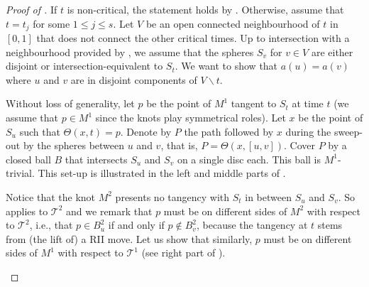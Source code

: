 \documentclass{article}
\newcommand{\T}{\mathcal{T}}
\begin{document}
\begin{proof}[Proof of ]
If $t$ is non-critical, the statement holds by . Otherwise, assume that $t = t_j$ for some $1\leq j \leq s$. Let $V$ be an open connected neighbourhood of $t$ in $[0,1]$ that does not connect the other critical times. Up to intersection with a neighbourhood provided by , we assume that the spheres $S_v$ for $v \in V$ are either disjoint or intersection-equivalent to $S_t$. We want to show that $a(u)= a(v)$ where $u$ and $v$ are in disjoint components of $V \smallsetminus t$.

Without loss of generality, let $p$ be the point of $M^1$ tangent to $S_t$ at time $t$ (we assume that $p \in M^1$ since the knots play symmetrical roles). Let $x$ be the point of $S_u$ such that $\Theta(x, t) =p$. Denote by $P$ the path followed by $x$ during the sweep-out by the spheres between $u$ and $v$, that is, $P = \Theta (x, [u,v])$. Cover $P$ by a closed ball $B$ that intersects $S_u$ and $S_v$ on a single disc each. This ball is $M^1$-trivial. This set-up is illustrated in the left and middle parts of .

Notice that the knot $M^2$ presents no tangency with $S_t$ in between $S_u$ and $S_v$. So  applies to $\T^2$ and we remark that $p$ must be on different sides of $M^2$ with respect to $\T^2$, i.e., that $p \in B^2_u$ if and only if $p \not \in B^2_v$, because the tangency at $t$ stems from (the lift of) a RII move. Let us show that similarly, $p$ must be on different sides of $M^1$ with respect to $\T^1$ (see right part of ).

\begin{figure}[ht]
\begin{center}
\end{center}
\end{figure}
\end{proof}
\end{document}
